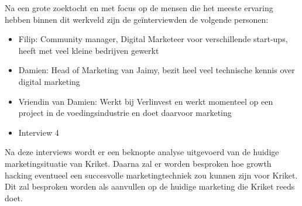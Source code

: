 Na een grote zoektocht en met focus op de mensen die het meeste ervaring hebben binnen dit werkveld zijn de geïnterviewden de volgende personen:
\begin{itemize} 
	\item Filip: Community manager, Digital Marketeer voor verschillende start-ups, heeft met veel kleine bedrijven gewerkt
	\item Damien: Head of Marketing van Jaimy, bezit heel veel technische kennis over digital marketing
	\item Vriendin van Damien: Werkt bij Verlinvest en werkt momenteel op een project in de voedingsindustrie en doet daarvoor marketing
	\item Interview 4
\end{itemize}

Na deze interviews wordt er een beknopte analyse uitgevoerd van de huidige marketingsituatie van Kriket. Daarna zal er worden besproken hoe growth hacking eventueel een succesvolle marketingtechniek zou kunnen zijn voor Kriket. Dit zal besproken worden als aanvullen op de huidige marketing die Kriket reeds doet.
